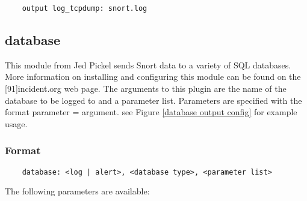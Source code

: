 \documentclass[english]{report}
\begin{document}
\begin{verbatim}
    output log_tcpdump: snort.log
\end{verbatim}

\subsection{database}
\label{database section}

This module from Jed Pickel sends Snort data to a variety of SQL databases.
More information on installing and configuring this module can be found on the
{[}91{]}incident.org web page. The arguments to this plugin are the name of the
database to be logged to and a parameter list. Parameters are specified with
the format parameter = argument.  see Figure \ref{database output config} for
example usage.

\subsubsection{Format}

\begin{verbatim}
    database: <log | alert>, <database type>, <parameter list>
\end{verbatim}

The following parameters are available:
\end{document}
